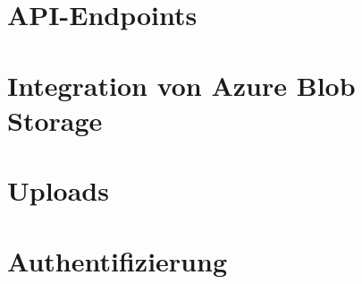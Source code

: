 \section{API-Endpoints}

\section{Integration von Azure Blob Storage}

\section{Uploads}


\section{Authentifizierung}
